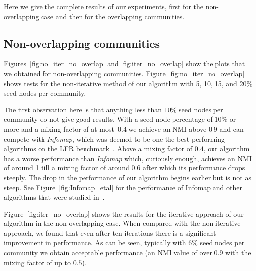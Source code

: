 Here we give the complete results of our experiments, first for the non-overlapping case and then for the overlapping communities.

\subsection{Non-overlapping communities}
Figures~\ref{fig:no_iter_no_overlap} and \ref{fig:iter_no_overlap} %
show the plots that we obtained for non-overlapping communities. Figure~\ref{fig:no_iter_no_overlap}
shows tests for the non-iterative method of our algorithm with 5, 10, 15, and 20$\%$ seed nodes per 
community. 

The first observation here is that anything less than 10$\%$ seed nodes per community 
do not give good results. With a seed node percentage of 10$\%$ or more and 
a mixing factor of at most~$0.4$ we achieve an NMI above $0.9$ and can compete with \textit{Infomap}, 
which was deemed to be one the best performing algorithms on the LFR benchmark~\cite{LF09}. 
Above a mixing factor of $0.4$, our algorithm has a worse performance than \textit{Infomap} 
which, curiously enough, achieves an NMI of around 1 till a mixing factor of around 
$0.6$ after which its performance drops steeply. The drop in the performance of our algorithm 
begins earlier but is not as steep. See Figure~\ref{fig:Infomap_etal} for the performance 
of Infomap and other algorithms that were studied in~\cite{LF09}. 

Figure~\ref{fig:iter_no_overlap} shows the results for the iterative approach of 
our algorithm in the non-overlapping case. When compared with the non-iterative approach, 
we found that even after ten iterations there is a significant improvement in 
performance. %
As can be seen, typically with 6$\%$ seed nodes per community we obtain 
acceptable performance (an NMI value of over $0.9$ with the mixing factor 
of up to $0.5$).  


